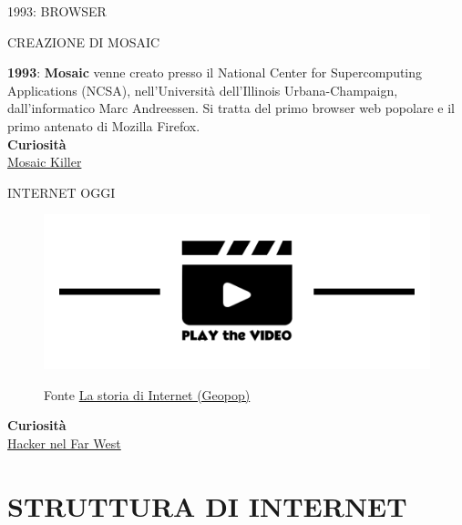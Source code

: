 \documentclass[aspectratio=1610]{beamer}
\begin{document}
\begin{frame}{1993: BROWSER}
    \begin{alertblock}{CREAZIONE DI MOSAIC}
        \begin{minipage}{0.98\linewidth}
            \justifying
            \textbf{1993}: \textbf{Mosaic} venne creato presso il National Center for Supercomputing Applications (NCSA), 
            nell’Università dell’Illinois Urbana-Champaign, dall’informatico Marc Andreessen. Si tratta del primo 
            browser web popolare e il primo antenato di Mozilla Firefox.\\
            \bigskip
            \tiny{\textbf{Curiosità}}\\
            \tiny{\href{https://en.m.wikipedia.org/wiki/Killer\_application}{Mosaic Killer}}
        \end{minipage}
    \end{alertblock}
\end{frame}

\begin{frame}{INTERNET OGGI}
    \begin{figure}
        \href{https://www.geopop.it/storia-della-nascita-di-internet-come-lo-usiamo-oggi-e-come-funziona-il-world-wide-web/}{\includegraphics[width=\linewidth]{img/play.png}}
        \caption{{Fonte \href{https://www.geopop.it/storia-della-nascita-di-internet-come-lo-usiamo-oggi-e-come-funziona-il-world-wide-web/}{La storia di Internet (Geopop)}}}
    \end{figure}
    \bigskip
    \tiny{\textbf{Curiosità}}\\
    \tiny{\href{https://attivissimo.blogspot.com/2022/01/hacker-nel-far-west.html}{Hacker nel Far West}} 
\end{frame}

\section{STRUTTURA DI INTERNET}
\end{document}
